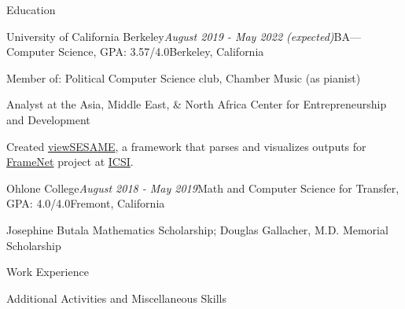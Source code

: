 \documentclass{resume} %
\begin{document}

\begin{rSection}{Education}
\begin{rSubsection}{University of California Berkeley}{\em August 2019 - May 2022 (expected)}{BA---Computer Science, GPA: 3.57/4.0}{Berkeley, California}
\item Member of: Political Computer Science club, Chamber Music (as pianist)
\item Analyst at the Asia, Middle East, \& North Africa Center for Entrepreneurship and Development
\item Created \href{https://github.com/citronella3alain/view-sesame}{viewSESAME}, a framework that parses and visualizes outputs for \href{https://www.icsi.berkeley.edu/icsi/}{FrameNet} project at \href{https://www.icsi.berkeley.edu/icsi/}{ICSI}.
\end{rSubsection}
\begin{rSubsection}{Ohlone College}{\em August 2018 - May 2019}{Math and Computer Science for Transfer, GPA: 4.0/4.0}{Fremont, California}
\item Josephine Butala Mathematics Scholarship; Douglas Gallacher, M.D. Memorial Scholarship
\end{rSubsection}
\end{rSection}
\begin{rSection}{Work Experience}



%
%
\end{rSection}
\begin{rSection}{Additional Activities and Miscellaneous Skills}

\end{rSection}
\end{document}
